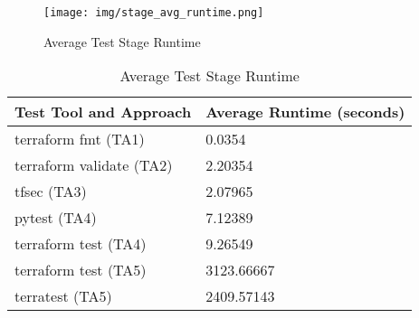 \begin{figure}[ht]
  \centering
  \texttt{[image: img/stage\_avg\_runtime.png]}
  \caption{Average Test Stage Runtime}
  \label{fig:stage_avg_runtime}
\end{figure}

\begin{table}[h!]
  \begin{tabular}{|l | l|}
    \hline
    \textbf{Test Tool and Approach} & \textbf{Average Runtime (seconds)} \\
    \hline
    terraform fmt (TA1) & 0.0354 \\
    \hline
    terraform validate (TA2) & 2.20354 \\
    \hline
    tfsec (TA3) & 2.07965 \\
    \hline
    pytest (TA4) & 7.12389 \\
    \hline
    terraform test (TA4) & 9.26549 \\
    \hline
    terraform test (TA5) & 3123.66667 \\
    \hline
    terratest (TA5) & 2409.57143 \\
    \hline
  \end{tabular}
  \caption{Average Test Stage Runtime}
  \label{tab:stage_avg_runtime}
\end{table}
